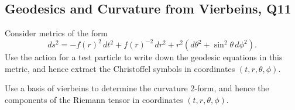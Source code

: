 \subsection{Geodesics and Curvature from Vierbeins, Q11}

Consider metrics of the form
\begin{equation}
    ds^2 = -f(r)^2\,dt^2 + f(r)^{-2}\,dr^2 + r^2\!\left(d\theta^2 + \sin^2\theta\,d\phi^2\right).
\end{equation}
Use the action for a test particle to write down the geodesic equations in this metric, and hence extract the Christoffel symbols in coordinates $(t,r,\theta,\phi)$.

Use a basis of vierbeins to determine the curvature 2-form, and hence the components of the Riemann tensor in coordinates $(t,r,\theta,\phi)$.


